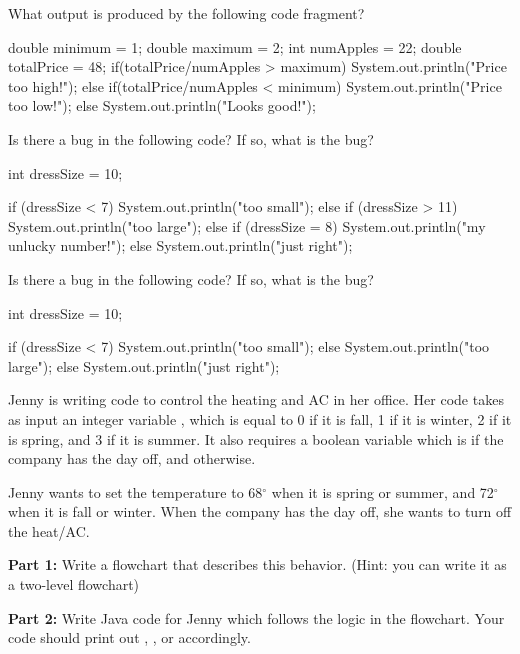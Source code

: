 \begin{exercise}
What output is produced by the following code fragment?

\begin{code}
double minimum = 1;
double maximum = 2;
int numApples = 22;
double totalPrice = 48;
if(totalPrice/numApples > maximum)
{
    System.out.println("Price too high!");
}
else if(totalPrice/numApples < minimum)
{
    System.out.println("Price too low!");
}
else
{
    System.out.println("Looks good!");
}
\end{code}
\end{exercise}

\begin{exercise}
Is there a bug in the following code? If so, what is the bug?

\begin{code}
int dressSize = 10;

if (dressSize < 7) 
{
    System.out.println("too small");
}
else if (dressSize > 11) 
{
    System.out.println("too large");
}
else if (dressSize = 8)
{
    System.out.println("my unlucky number!");
}
else
{
    System.out.println("just right");
}
\end{code}
\end{exercise}

\begin{exercise}
Is there a bug in the following code? If so, what is the bug?

\begin{code}
int dressSize = 10;

if (dressSize < 7) 
{
    System.out.println("too small");
}
else
{
    System.out.println("too large");
}
else
{
    System.out.println("just right");
}
\end{code}
\end{exercise}


\begin{exercise}
Jenny is writing code to control the heating and AC in her office. Her code takes as input an integer variable , which is equal to 0 if it is fall, 1 if it is winter, 2 if it is spring, and 3 if it is summer. It also requires a boolean variable  which is  if the company has the day off, and  otherwise.

Jenny wants to set the temperature to 68$^\circ$ when it is spring or summer, and 72$^\circ$ when it is fall or winter. When the company has the day off, she wants to turn off the heat/AC. 

\textbf{Part 1:} Write a flowchart that describes this behavior. (Hint: you can write it as a two-level flowchart)

\textbf{Part 2:} Write Java code for Jenny which follows the logic in the flowchart. Your code should print out , , or  accordingly.
\end{exercise}

